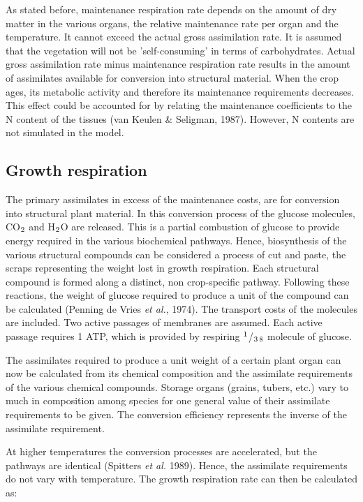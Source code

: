 As stated before, maintenance respiration rate depends on the amount of dry matter in the
various organs, the relative maintenance rate per organ and the temperature. It cannot
exceed the actual gross assimilation rate. It is assumed that the vegetation will not be
'self-consuming' in terms of carbohydrates. Actual gross assimilation rate minus 
maintenance respiration rate results in the amount of assimilates available for conversion into
structural material. When the crop ages, its metabolic activity and therefore its
maintenance requirements decreases. This effect could be accounted for by relating 
the maintenance coefficients to the N content of the tissues (van Keulen \& Seligman, 1987).
However, N contents are not simulated in the model. 

\subsection{Growth respiration}

The primary assimilates in excess of the maintenance costs, are for conversion into
structural plant material. In this conversion process of the glucose molecules, CO$_{{\rm 2}}$ and
H$_{{\rm 2}}$O are released. This is a partial combustion of glucose to provide energy required in
the various biochemical pathways. Hence, biosynthesis of the various structural compounds can 
be considered a process of cut and paste, the scraps representing the weight
lost in growth respiration.
Each structural compound is formed along a distinct, non crop-specific pathway.
Following these reactions, the weight of glucose required to produce a unit of the
compound can be calculated (Penning de Vries {\it et al.}, 1974). The transport costs of the
molecules are included. Two active passages of membranes are assumed. Each active
passage requires 1 ATP, which is provided by respiring $^{{\rm 1}}$/$_{{\rm 3}}$$_{{\rm 8}}$ molecule of glucose.

The assimilates required to produce a unit weight of a certain plant organ can now be
calculated from its chemical composition and the assimilate requirements of the various
chemical compounds. Storage organs (grains, tubers, etc.) vary to much in composition
among species for one general value of their assimilate requirements to be given. The
conversion efficiency represents the inverse of the assimilate requirement.

At higher temperatures the conversion processes are accelerated, but the pathways are
identical (Spitters {\it et al.} 1989). Hence, the assimilate requirements do not vary with
temperature. The growth respiration rate can then be calculated as:


